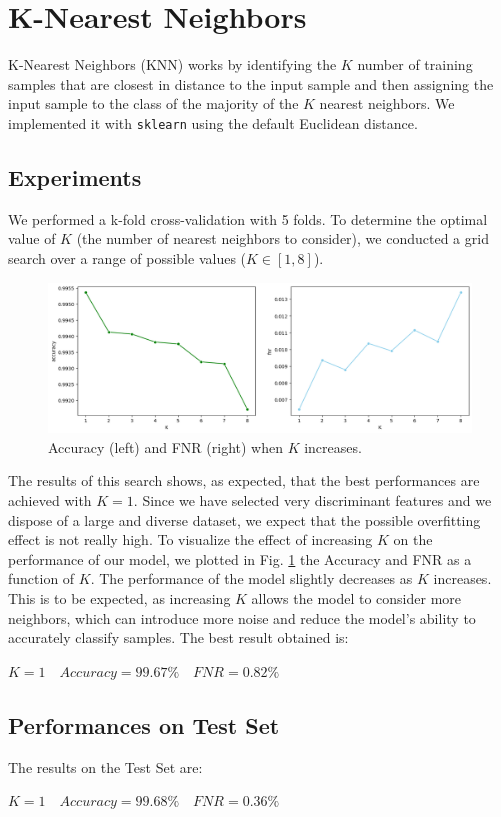 \documentclass[twocolumn, switch]{article} %
\newcommand\x{0.7}
\begin{document}
\section{K-Nearest Neighbors}
\label{sec:knn}
K-Nearest Neighbors (KNN) works by identifying the $K$ number of training samples that are closest in distance to the input sample and then assigning the input sample to the class of the majority of the $K$ nearest neighbors. We implemented it with \texttt{sklearn} \cite{scikit-learn} using the default Euclidean distance.
\subsection{Experiments}
We performed a k-fold cross-validation with 5 folds.
To determine the optimal value of $K$ (the number of nearest neighbors to consider), we conducted a grid search over a range of possible values ($K \in [1, 8]$).
\begin{figure}[ht!]
	\centering
	\includegraphics[width=\x\linewidth]{knn_accuracy_fnr.png}
	\caption{Accuracy (left) and FNR (right) when $K$ increases.}
	\label{fig:knntrain}
\end{figure}
The results of this search shows, as expected, that the best performances are achieved with $K=1$. Since we have selected very discriminant features and we dispose of a large and diverse dataset, we expect that the possible overfitting effect is not really high.
To visualize the effect of increasing $K$ on the performance of our model, we plotted in Fig. \ref{fig:knntrain} the Accuracy and FNR as a function of $K$. The performance of the model slightly decreases as $K$ increases. This is to be expected, as increasing $K$ allows the model to consider more neighbors, which can introduce more noise and reduce the model's ability to accurately classify samples. The best result obtained is:
\begin{center}
	$K=1 \quad Accuracy=99.67\% \quad FNR=0.82\%$
\end{center}

\subsection{Performances on Test Set}
The results on the Test Set are:
\begin{center}
	$K=1 \quad Accuracy=99.68\% \quad FNR=0.36\%$
\end{center}
\end{document}
